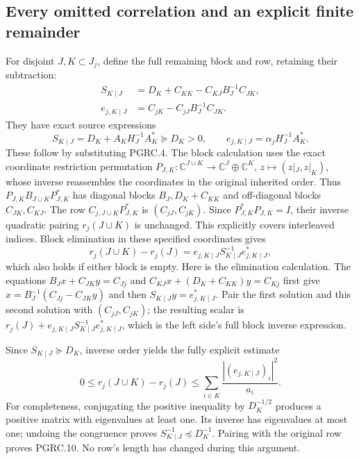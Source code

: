 \subsection{Every omitted correlation and an explicit finite remainder}

For disjoint $J,K\subset J_j$, define the full remaining block
and row, retaining their subtraction:
\[
 \begin{aligned}
 S_{K\mid J}&=D_K+C_{KK}-C_{KJ}B_J^{-1}C_{JK},\\
 e_{j,K\mid J}&=C_{jK}-C_{jJ}B_J^{-1}C_{JK}.
 \end{aligned}
 \tag{PGRC.7}\label{GraphV2:eq:pgrc-remaining-block}
\]
They have exact source expressions
\[
 S_{K\mid J}=D_K+A_KH_J^{-1}A_K^*\succeq D_K>0,
 \qquad e_{j,K\mid J}=\alpha_jH_J^{-1}A_K^*.
 \tag{PGRC.8}\label{GraphV2:eq:pgrc-remaining-source}
\]
These follow by substituting PGRC.4. The block calculation uses
the exact coordinate restriction permutation
$P_{J,K}:\mathbb{C}^{J\cup K}\to\mathbb{C}^J\oplus\mathbb{C}^K$,
$z\mapsto(z|_J,z|_K)$, whose inverse reassembles the coordinates
in the original inherited order. Thus
$P_{J,K}B_{J\cup K}P_{J,K}^*$ has diagonal blocks
$B_J,D_K+C_{KK}$ and off-diagonal blocks $C_{JK},C_{KJ}$.
The row $C_{j,J\cup K}P_{J,K}^*$ is $(C_{jJ},C_{jK})$.
Since $P_{J,K}^*P_{J,K}=I$, their inverse quadratic pairing
$r_j(J\cup K)$ is unchanged. This explicitly covers interleaved
indices. Block elimination in these specified coordinates gives
\[
 r_j(J\cup K)-r_j(J)
 =e_{j,K\mid J}S_{K\mid J}^{-1}e_{j,K\mid J}^*,
 \tag{PGRC.9}\label{GraphV2:eq:pgrc-exact-remainder}
\]
which also holds if either block is empty. Here is the elimination
calculation. The equations
$B_Jx+C_{JK}y=C_{Jj}$ and
$C_{KJ}x+(D_K+C_{KK})y=C_{Kj}$ first give
$x=B_J^{-1}(C_{Jj}-C_{JK}y)$ and then
$S_{K\mid J}y=e_{j,K\mid J}^*$. Pair the first solution and this
second solution with $(C_{jJ},C_{jK})$; the resulting scalar is
$r_j(J)+e_{j,K\mid J}S_{K\mid J}^{-1}e_{j,K\mid J}^*$,
which is the left side's full block inverse expression.

Since $S_{K\mid J}\succeq D_K$, inverse order yields the fully
explicit estimate
\[
 0\leq r_j(J\cup K)-r_j(J)
 \leq\sum_{i\in K}\frac{|(e_{j,K\mid J})_i|^2}{a_i}.
 \tag{PGRC.10}\label{GraphV2:eq:pgrc-remainder-bound}
\]
For completeness, conjugating the positive inequality by
$D_K^{-1/2}$ produces a positive matrix with eigenvalues at least
one. Its inverse has eigenvalues at most one; undoing the
congruence proves $S_{K\mid J}^{-1}\preceq D_K^{-1}$.
Pairing with the original row proves PGRC.10. No row's length
has changed during this argument.

